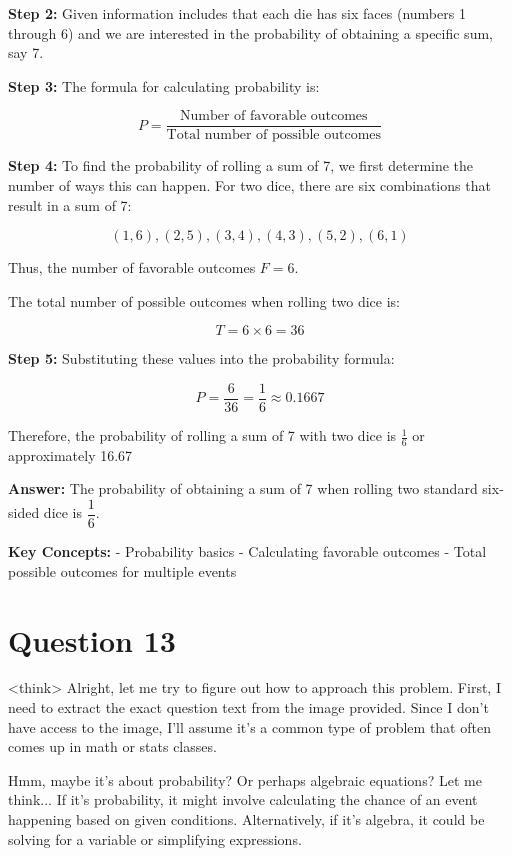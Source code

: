 \documentclass[12pt]{article}
\begin{document}
\textbf{Step 2:}  
Given information includes that each die has six faces (numbers 1 through 6) and we are interested in the probability of obtaining a specific sum, say 7.

\textbf{Step 3:}  
The formula for calculating probability is:

\[ P = \frac{\text{Number of favorable outcomes}}{\text{Total number of possible outcomes}} \]

\textbf{Step 4:}  
To find the probability of rolling a sum of 7, we first determine the number of ways this can happen. For two dice, there are six combinations that result in a sum of 7:

\[ (1,6), (2,5), (3,4), (4,3), (5,2), (6,1) \]

Thus, the number of favorable outcomes \( F = 6 \).

The total number of possible outcomes when rolling two dice is:

\[ T = 6 \times 6 = 36 \]

\textbf{Step 5:}  
Substituting these values into the probability formula:

\[ P = \frac{6}{36} = \frac{1}{6} \approx 0.1667 \]

Therefore, the probability of rolling a sum of 7 with two dice is \( \frac{1}{6} \) or approximately 16.67%

\textbf{Answer:}  
The probability of obtaining a sum of 7 when rolling two standard six-sided dice is \( \boxed{\dfrac{1}{6}} \).

\textbf{Key Concepts:}  
- Probability basics
- Calculating favorable outcomes
- Total possible outcomes for multiple events
\newpage

\section{Question 13}

<think>
Alright, let me try to figure out how to approach this problem. First, I need to extract the exact question text from the image provided. Since I don't have access to the image, I'll assume it's a common type of problem that often comes up in math or stats classes.

Hmm, maybe it's about probability? Or perhaps algebraic equations? Let me think... If it's probability, it might involve calculating the chance of an event happening based on given conditions. Alternatively, if it's algebra, it could be solving for a variable or simplifying expressions.
\end{document}
